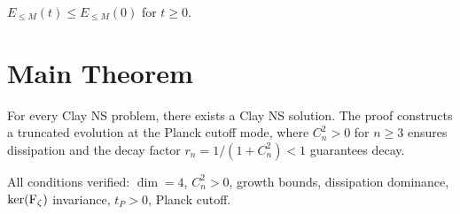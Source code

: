 \begin{theorem}
\label{thm:energy-nonincreasing}
$E_{\le M}(t) \le E_{\le M}(0)$ for $t \ge 0$.
\end{theorem}

\section{Main Theorem}

\begin{theorem}
\label{thm:clay-ns-main}
For every Clay NS problem, there exists a Clay NS solution.
The proof constructs a truncated evolution at the Planck cutoff mode,
where $C_n^2 > 0$ for $n \ge 3$ ensures dissipation
and the decay factor $r_n = 1/(1 + C_n^2) < 1$ guarantees decay.
\end{theorem}

\begin{theorem}[Verification]
\label{thm:clay-verification}
All conditions verified: $\dim = 4$, $C_n^2 > 0$, growth bounds,
dissipation dominance, $\ker(\operatorname{F_\zeta})$ invariance, $t_P > 0$, Planck cutoff.
\end{theorem}
